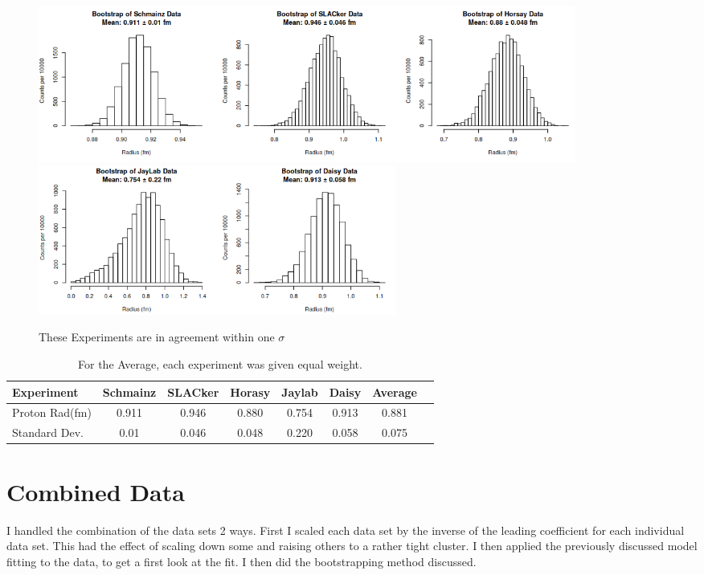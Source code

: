 \documentclass[12pt]{article}
\begin{document}
\begin{figure}[!htb]
  \centering
  \includegraphics[width=500pt]{exp_hist_data_a.png}
  \includegraphics[width=333pt]{exp_hist_data_b.png}
  \caption{These Experiments are in agreement within one $\sigma$}
\end{figure}

\pagebreak

\begin{table}[!htb]
  \centering
  \begin{tabular}{|l|c|c|c|c|c|c|c|}
    \hline
    Experiment      & Schmainz  & SLACker & Horasy  & Jaylab  & Daisy & Average \\\hline
    Proton Rad(fm)  & 0.911     & 0.946   & 0.880   & 0.754   & 0.913 & 0.881   \\\hline
    Standard Dev.   & 0.01      & 0.046   & 0.048   & 0.220   & 0.058 & 0.075   \\\hline
  \end{tabular}
  \caption{For the Average, each experiment was given equal weight.}
\end{table}

\pagebreak

\section{Combined Data}

I handled the combination of the data sets 2 ways.
First I scaled each data set by the inverse of the leading coefficient for each individual data set.
This had the effect of scaling down some and raising others to a rather tight cluster.
I then applied the previously discussed model fitting to the data, to get a first look at the fit.
I then did the bootstrapping method discussed.
\end{document}
